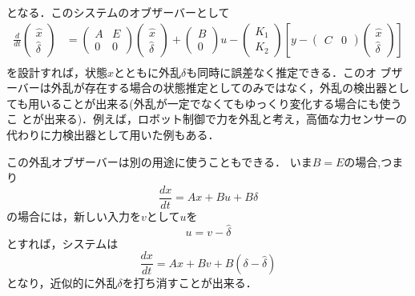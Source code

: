 となる．このシステムのオブザーバーとして
\begin{align}
 \frac{d}{dt}
  \left(\begin{array}{c}
         \hat{x} \\
	 \hat{\delta}
	\end{array}\right)
  &=
  \left(\begin{array}{cc}
         A & E \\
	 0 & 0
	\end{array}\right)
  \left(\begin{array}{c}
         \hat{x} \\
	 \hat{\delta}
	\end{array}\right)
  +
  \left(\begin{array}{c}
         B \\
	 0
	\end{array}\right)
  u -
  \left(\begin{array}{c}
         K_1 \\
	 K_2
	\end{array}\right)
  \left[y -
   \left(\begin{array}{cc}
          C & 0
	 \end{array}\right)
   \left(\begin{array}{c}
	  \hat{x} \\
	  \hat{\delta}
	 \end{array}\right)\right] \nonumber \\
\end{align}
を設計すれば，状態$x$とともに外乱$\delta$も同時に誤差なく推定できる．このオ
ブザーバーは外乱が存在する場合の状態推定としてのみではなく，外乱の検出器とし
ても用いることが出来る(外乱が一定でなくてもゆっくり変化する場合にも使うこ
とが出来る)．例えば，ロボット制御で力を外乱と考え，高価な力センサーの代わりに力検出器として用いた例もある．

この外乱オブザーバーは別の用途に使うこともできる．
いま$B=E$の場合,つまり
\begin{equation}
 \frac{dx}{dt} = A x + B u + B \delta
\end{equation}
の場合には，新しい入力を$v$として$u$を
\begin{equation}
 u = v - \hat{\delta}
\end{equation}
とすれば，システムは
\begin{equation}
 \frac{dx}{dt} = A x + B v + B (\delta- \hat{\delta})
\end{equation}
となり，近似的に外乱$\delta$を打ち消すことが出来る．

